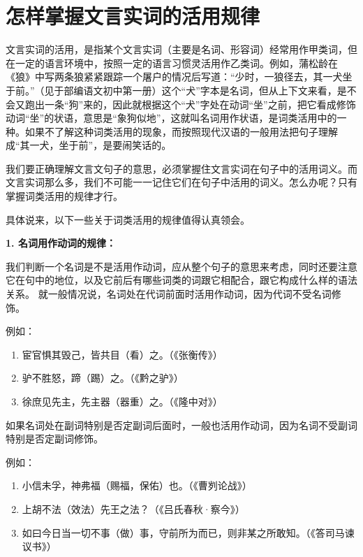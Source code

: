 \section{怎样掌握文言实词的活用规律}

文言实词的活用，是指某个文言实词（主要是名词、形容词）经常用作甲类词，但在一定的语言环境中，按照一定的语言习惯灵活用作乙类词。例如，蒲松龄在《狼》中写两条狼紧紧跟踪一个屠户的情况后写道：“少时，一狼径去，其一犬坐于前。”（见于部编语文初中第一册）这个“犬”字本是名词，但从上下文来看，是不会又跑出一条“狗”来的，因此就根据这个“犬”字处在动词“坐”之前，把它看成修饰动词“坐”的状语，意思是“象狗似地”，这就叫名词用作状语，是词类活用中的一种。如果不了解这种词类活用的现象，而按照现代汉语的一般用法把句子理解成“其一犬，坐于前”，是要闹笑话的。

我们要正确理解文言文句子的意思，必须掌握住文言实词在句子中的活用词义。而文言实词那么多，我们不可能一一记住它们在句子中活用的词义。怎么办呢？只有掌握词类活用的规律才行。

具体说来，以下一些关于词类活用的规律值得认真领会。

\textbf{1. 名词用作动词的规律：}

我们判断一个名词是不是活用作动词，应从整个句子的意思来考虑，同时还要注意它在句中的地位，以及它前后有哪些词类的词跟它相配合，跟它构成什么样的语法关系。
就一般情况说，名词处在代词前面时活用作动词，因为代词不受名词修饰。

例如：
\newpage

\begin{enumerate}[label=\textcircled{\arabic*}]
	\item 宦官惧其毁己，皆共目（看）之。（《张衡传》）
	\item 驴不胜怒，蹄（踢）之。（《黔之驴》）
	\item 徐庶见先主，先主器（器重）之。（《隆中对》）
\end{enumerate}

如果名词处在副词特别是否定副词后面时，一般也活用作动词，因为名词不受副词特别是否定副词修饰。

例如：

\begin{enumerate}[label=\textcircled{\arabic*}]
	\item 小信未孚，神弗福（赐福，保佑）也。（《曹刿论战》）
	\item 上胡不法（效法）先王之法？（《吕氏春秋·察今》）
	\item 如曰今日当一切不事（做）事，守前所为而已，则非某之所敢知。（《答司马谏议书》）
\end{enumerate}

